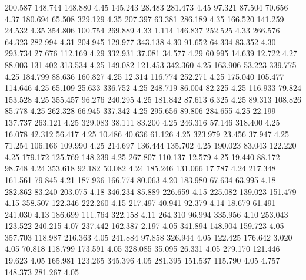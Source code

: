  200.587  148.744  148.880         4.45
 145.243   28.483  281.473         4.45
  97.321   87.504   70.656         4.37
 180.694   65.508  329.129         4.35
 207.397   63.381  286.189         4.35
 166.520  141.259   24.532         4.35
 354.806  100.754  269.889         4.33
   1.114  146.837  252.525         4.33
 266.576   64.323  282.994         4.31
 204.945  129.977  343.138         4.30
  91.652   64.334   83.352         4.30
 293.734   27.676  112.169         4.29
 332.931   37.081   34.577         4.29
  60.995   14.639   12.722         4.27
  88.003  131.402  313.534         4.25
 149.082  121.453  342.360         4.25
 163.906   53.223  339.775         4.25
 184.799   88.636  160.827         4.25
  12.314  116.774  252.271         4.25
 175.040  105.477  114.646         4.25
  65.109   25.633  336.752         4.25
 248.719   86.004   82.225         4.25
 116.933   79.824  153.528         4.25
 355.457   96.276  240.295         4.25
 181.842   87.613    6.325         4.25
  89.313  108.826   85.778         4.25
 262.328   66.945  337.342         4.25
 295.656   89.806  284.655         4.25
  22.199  137.737  263.121         4.25
 329.083   38.111   83.200         4.25
 246.316   57.146  318.400         4.25
  16.078   42.312   56.417         4.25
  10.486   40.636   61.126         4.25
 323.979   23.456   37.947         4.25
  71.254  106.166  109.990         4.25
 214.697  136.444  135.702         4.25
 190.023   83.043  122.220         4.25
 179.172  125.769  148.239         4.25
 267.807  110.137   12.579         4.25
  19.440   88.172   98.748         4.24
 353.618   92.182   50.082         4.24
 185.246  131.066   17.787         4.24
 217.348  161.561   79.845         4.21
 187.936  166.774   80.063         4.20
 183.980   67.634   63.995         4.18
 282.862   83.240  203.075         4.18
 346.234   85.889  226.659         4.15
 225.082  139.023  151.479         4.15
 358.507  122.346  222.260         4.15
 217.497   40.941   92.379         4.14
  18.679   61.491  241.030         4.13
 186.699  111.764  322.158         4.11
 264.310   96.994  335.956         4.10
 253.043  123.522  240.215         4.07
 237.442  162.387    2.197         4.05
 341.894  148.904  159.723         4.05
 357.703  118.987  216.363         4.05
 241.884   97.858  326.944         4.05
 122.425  176.642    3.020         4.05
  70.818  118.799  173.591         4.05
 328.085   35.095   26.331         4.05
 279.170  121.446   19.623         4.05
 165.981  123.265  345.396         4.05
 281.395  151.537  115.790         4.05
   4.757  148.373  281.267         4.05

